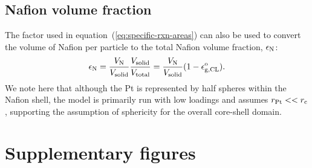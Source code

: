 \documentclass[final,3p,times,onecolumn]{elsarticle}    %
\begin{document}
\subsection{Nafion volume fraction}
The factor used in equation~(\ref{eq:specific-rxn-areas}) can also be used to convert the volume of Nafion per particle to the total Nafion volume fraction, $\epsilon_{\rm N}$:
\begin{equation}
    \epsilon_{\rm N} = \frac{V_{\rm N}}{V_{\rm solid}} \frac{V_{\rm solid}}{V_{\rm total}}
                     = \frac{V_{\rm N}}{V_{\rm solid}} (1 - \epsilon_{\rm g,CL}^{\rm o}).
\end{equation}
We note here that although the Pt is represented by half spheres within the Nafion shell, the model is primarily run with low loadings and assumes $r_{\rm Pt} << r_{\rm c}$, supporting the assumption of sphericity for the overall core-shell domain. 

\section{Supplementary figures}
\end{document}
